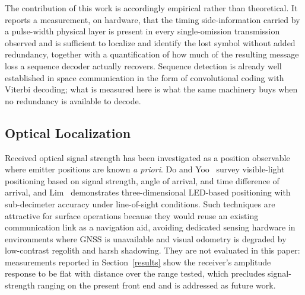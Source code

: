 The contribution of this work is accordingly empirical rather than theoretical.
It reports a measurement, on hardware, that the timing side-information carried
by a pulse-width physical layer is present in every single-omission
transmission observed and is sufficient to localize and identify the lost
symbol without added redundancy, together with a quantification of how much of
the resulting message loss a sequence decoder actually recovers. Sequence
detection is already well established in space communication in the form of
convolutional coding with Viterbi decoding; what is measured here is what the
same machinery buys when no redundancy is available to decode.

\subsection{Optical Localization}

Received optical signal strength has been investigated as a position observable
where emitter positions are known \textit{a priori}. Do and Yoo~\cite{DoYoo2016}
survey visible-light positioning based on signal strength, angle of arrival, and
time difference of arrival, and Lim~\cite{Lim2015} demonstrates
three-dimensional LED-based positioning with sub-decimeter accuracy under
line-of-sight conditions. Such techniques are attractive for surface operations
because they would reuse an existing communication link as a navigation aid,
avoiding dedicated sensing hardware in environments where GNSS is unavailable
and visual odometry is degraded by low-contrast regolith and harsh shadowing.
They are not evaluated in this paper: measurements reported in
Section~\ref{results} show the receiver's amplitude response to be flat with
distance over the range tested, which precludes signal-strength ranging on the
present front end and is addressed as future work.
